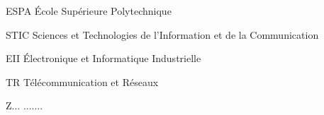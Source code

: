 \begin{listofabbr}[3cm]
\item [ESPA] École Supérieure Polytechnique
\item [STIC] Sciences et Technologies de l’Information et de la Communication
\item [EII] Électronique et Informatique Industrielle
\item [TR] Télécommunication et Réseaux
\item [Z...] .......
\end{listofabbr}

